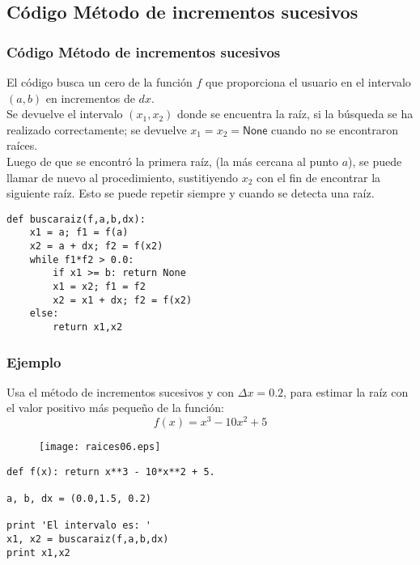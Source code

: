 \documentclass[12pt]{beamer}
\begin{document}
\subsection{C\'{o}digo M\'{e}todo de incrementos sucesivos}
\begin{frame}
\frametitle{C\'{o}digo M\'{e}todo de incrementos sucesivos}
El c\'{o}digo busca un cero de la función $f$ que proporciona el usuario en el intervalo
$(a,b)$ en incrementos de $dx$.
\\
\bigskip
Se devuelve el intervalo $(x_{1}, x_{2})$ donde se encuentra la ra\'{i}z, si la b\'{u}squeda
se ha realizado correctamente; se devuelve $x_{1} = x_{2} = \mathsf{None}$ cuando no se encontraron ra\'{i}ces.
\\
\bigskip
Luego de que se encontr\'{o} la primera ra\'{i}z, (la m\'{a}s cercana al punto $a$), se puede llamar de nuevo al procedimiento, sustitiyendo $x_{2}$ con el fin de encontrar la siguiente ra\'{i}z. Esto se puede repetir siempre y cuando se detecta una ra\'{i}z.
\end{frame}
\begin{frame}[fragile]
\begin{lstlisting}
def buscaraiz(f,a,b,dx):
    x1 = a; f1 = f(a)
    x2 = a + dx; f2 = f(x2)
    while f1*f2 > 0.0:
        if x1 >= b: return None
        x1 = x2; f1 = f2
        x2 = x1 + dx; f2 = f(x2)
    else:
        return x1,x2
\end{lstlisting}
\end{frame}
\begin{frame}
\frametitle{Ejemplo}
Usa el m\'{e}todo de incrementos sucesivos y con $\Delta x= 0.2$, para estimar la ra\'{i}z con el valor positivo m\'{a}s pequeño de la funci\'{o}n:
\[ f(x) = x^{3} - 10 x^{2} + 5\]
\end{frame}
\begin{frame}
\begin{figure}
	\centering
	\texttt{[image: raices06.eps]} 
\end{figure}
\end{frame}
\begin{frame}[fragile]
\begin{lstlisting}
def f(x): return x**3 - 10*x**2 + 5.

a, b, dx = (0.0,1.5, 0.2)

print 'El intervalo es: '
x1, x2 = buscaraiz(f,a,b,dx)
print x1,x2
\end{lstlisting}
\end{frame}
\end{document}
